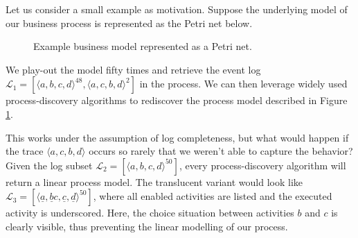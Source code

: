 Let us consider a small example as motivation. Suppose the underlying model of our business process is represented as the Petri net below.

\begin{figure}[H]
    \centering
\caption{Example business model represented as a Petri net.}
\label{petrinet}

\end{figure}

We play-out the model fifty times and retrieve the event log $\mathcal{L}_1 = [ \langle a, b, c, d \rangle ^{48}, \langle a, c, b, d \rangle^2 ]$ in the process. We can then leverage widely used process-discovery algorithms to rediscover the process model described in Figure \ref{petrinet}. 

This works under the assumption of log completeness, but what would happen if the trace $\langle a, c, b, d \rangle$ occurs so rarely that we weren't able to capture the behavior? Given the log subset $\mathcal{L}_2 = [ \langle a, b, c, d \rangle ^{50}]$, every process-discovery algorithm will return a linear process model. The translucent variant would look like $\mathcal{L}_3 = [ \langle \underline{a}, \underline{b}c,  \underline{c},  \underline{d} \rangle ^{50}]$, where all enabled activities are listed and the executed activity is underscored. Here, the choice situation between activities $b$ and $c$ is clearly visible, thus preventing the linear modelling of our process.

